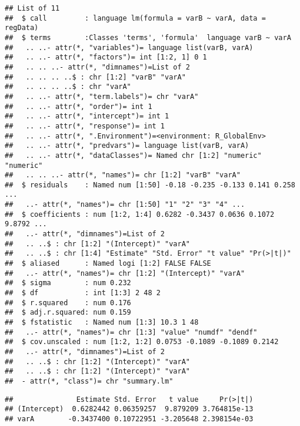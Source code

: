 \documentclass[
]{article}
\newenvironment{Shaded}{\begin{snugshade}}{\end{snugshade}}
\newcommand{\CommentTok}[1]{\textcolor[rgb]{0.56,0.35,0.01}{\textit{#1}}}
\newcommand{\FunctionTok}[1]{\textcolor[rgb]{0.00,0.00,0.00}{#1}}
\newcommand{\NormalTok}[1]{#1}
\newcommand{\SpecialCharTok}[1]{\textcolor[rgb]{0.00,0.00,0.00}{#1}}
\begin{document}
\begin{verbatim}
## List of 11
##  $ call         : language lm(formula = varB ~ varA, data = regData)
##  $ terms        :Classes 'terms', 'formula'  language varB ~ varA
##   .. ..- attr(*, "variables")= language list(varB, varA)
##   .. ..- attr(*, "factors")= int [1:2, 1] 0 1
##   .. .. ..- attr(*, "dimnames")=List of 2
##   .. .. .. ..$ : chr [1:2] "varB" "varA"
##   .. .. .. ..$ : chr "varA"
##   .. ..- attr(*, "term.labels")= chr "varA"
##   .. ..- attr(*, "order")= int 1
##   .. ..- attr(*, "intercept")= int 1
##   .. ..- attr(*, "response")= int 1
##   .. ..- attr(*, ".Environment")=<environment: R_GlobalEnv> 
##   .. ..- attr(*, "predvars")= language list(varB, varA)
##   .. ..- attr(*, "dataClasses")= Named chr [1:2] "numeric" "numeric"
##   .. .. ..- attr(*, "names")= chr [1:2] "varB" "varA"
##  $ residuals    : Named num [1:50] -0.18 -0.235 -0.133 0.141 0.258 ...
##   ..- attr(*, "names")= chr [1:50] "1" "2" "3" "4" ...
##  $ coefficients : num [1:2, 1:4] 0.6282 -0.3437 0.0636 0.1072 9.8792 ...
##   ..- attr(*, "dimnames")=List of 2
##   .. ..$ : chr [1:2] "(Intercept)" "varA"
##   .. ..$ : chr [1:4] "Estimate" "Std. Error" "t value" "Pr(>|t|)"
##  $ aliased      : Named logi [1:2] FALSE FALSE
##   ..- attr(*, "names")= chr [1:2] "(Intercept)" "varA"
##  $ sigma        : num 0.232
##  $ df           : int [1:3] 2 48 2
##  $ r.squared    : num 0.176
##  $ adj.r.squared: num 0.159
##  $ fstatistic   : Named num [1:3] 10.3 1 48
##   ..- attr(*, "names")= chr [1:3] "value" "numdf" "dendf"
##  $ cov.unscaled : num [1:2, 1:2] 0.0753 -0.1089 -0.1089 0.2142
##   ..- attr(*, "dimnames")=List of 2
##   .. ..$ : chr [1:2] "(Intercept)" "varA"
##   .. ..$ : chr [1:2] "(Intercept)" "varA"
##  - attr(*, "class")= chr "summary.lm"
\end{verbatim}

\begin{Shaded}
\end{Shaded}

\begin{verbatim}
##               Estimate Std. Error   t value     Pr(>|t|)
## (Intercept)  0.6282442 0.06359257  9.879209 3.764815e-13
## varA        -0.3437400 0.10722951 -3.205648 2.398154e-03
\end{verbatim}
\end{document}
